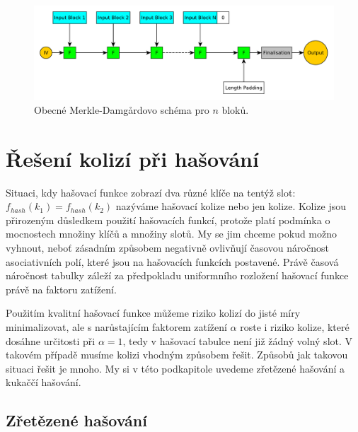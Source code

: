 \begin{figure}
	\centering
	\includegraphics[width=\textwidth]{fig/merkle_damgard}
	\caption{Obecné Merkle-Damg\r{a}rdovo schéma pro $n$ bloků.}
	\label{fig:merkle_damgard}
\end{figure}

\section{Řešení kolizí při hašování}
\label{sec:collisions}

Situaci, kdy hašovací funkce zobrazí dva různé klíče na tentýž slot:
$f_{hash} (k_{1}) = f_{hash} (k_{2})$ nazýváme hašovací kolize nebo jen kolize. 
Kolize jsou přirozeným důsledkem použití hašovacích funkcí, protože platí podmínka o
mocnostech množiny klíčů a množiny slotů.
My se jim chceme pokud možno vyhnout, neboť zásadním způsobem negativně ovlivňují 
časovou náročnost asociativních polí, které jsou na hašovacích funkcích postavené. 
Právě časová náročnost tabulky záleží za předpokladu uniformního rozložení 
hašovací funkce právě na faktoru zatížení. 

Použitím kvalitní hašovací funkce můžeme riziko kolizí do jisté míry minimalizovat, ale
s narůstajícím faktorem zatížení $\alpha$ roste i riziko kolize, které dosáhne 
určitosti při $\alpha = 1$, tedy v hašovací tabulce není již žádný volný slot.
V takovém případě musíme kolizi vhodným způsobem řešit. Způsobů jak takovou situaci
řešit je mnoho. My si v této podkapitole uvedeme zřetězené hašování a kukaččí hašování.

\subsection{Zřetězené hašování}

